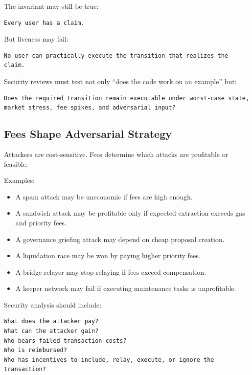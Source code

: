 The invariant may still be true:

\begin{lstlisting}
Every user has a claim.
\end{lstlisting}

But liveness may fail:

\begin{lstlisting}
No user can practically execute the transition that realizes the claim.
\end{lstlisting}

Security reviews must test not only ``does the code work on an example''
but:

\begin{lstlisting}
Does the required transition remain executable under worst-case state,
market stress, fee spikes, and adversarial input?
\end{lstlisting}

\subsection{Fees Shape Adversarial Strategy}

Attackers are cost-sensitive. Fees determine which attacks are
profitable or feasible.

Examples:

\begin{itemize}
\tightlist
\item
  A spam attack may be uneconomic if fees are high enough.
\item
  A sandwich attack may be profitable only if expected extraction
  exceeds gas and priority fees.
\item
  A governance griefing attack may depend on cheap proposal creation.
\item
  A liquidation race may be won by paying higher priority fees.
\item
  A bridge relayer may stop relaying if fees exceed compensation.
\item
  A keeper network may fail if executing maintenance tasks is
  unprofitable.
\end{itemize}

Security analysis should include:

\begin{lstlisting}
What does the attacker pay?
What can the attacker gain?
Who bears failed transaction costs?
Who is reimbursed?
Who has incentives to include, relay, execute, or ignore the transaction?
\end{lstlisting}

